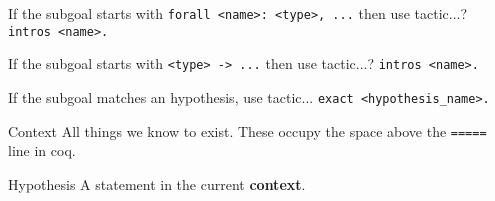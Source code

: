\documentclass[avery5871, grid]{flashcards} %
\renewcommand{\'}{\hspace{0.5mm}'}			%
\begin{document}
\begin{flashcard}[Tactic]{If the subgoal starts with \texttt{forall <name>: <type>, ...} then use tactic...?}
\texttt{intros <name>.}
\end{flashcard}

\begin{flashcard}[Tactic]{If the subgoal starts with \texttt{<type> -> ...} then use tactic...?}
\texttt{intros <name>.}
\end{flashcard}

\begin{flashcard}[Tactic]{If the subgoal matches an hypothesis, use tactic...}
\texttt{exact <hypothesis\_name>.}
\end{flashcard}

\begin{flashcard}[Definition]{Context}
All things we know to exist. These occupy the space above the \texttt{=====} line in coq.
\end{flashcard}

\begin{flashcard}[Definition]{Hypothesis}
A statement in the current \textbf{context}.
\end{flashcard}
\end{document}
